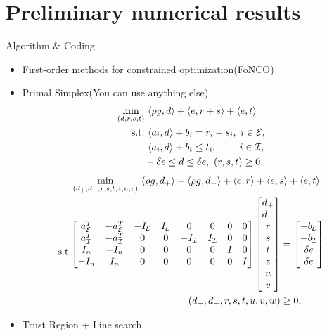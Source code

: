 \documentclass[8pt]{beamer}
\begin{document}
\section{Preliminary numerical results}
	
	\begin{frame}{Algorithm \& Coding}\begin{itemize}
		\vfill
			\item First-order methods for constrained optimization(FoNCO)
		\vfill
			\item Primal Simplex(You can use anything else)
		\vfill
			\begin{equation}\label{sub.primal.lp}
			  \baligned
				\min_{(d, r, s, t)} &\   \langle \rho g, d\rangle + \langle e, r+s\rangle + \langle e, t\rangle \ \\
				 \st &\  \langle a_i, d\rangle + b_i = r_i-s_i, \ i\in\Ecal, \\   
					  &\  \langle a_i, d\rangle + b_i \le t_i, \qquad\  i\in\Ical, \\   
					  & -\delta e \le  d \le \delta e, \   (r,s,t) \ge 0.
			  \ealigned
			\end{equation}
		\vfill
			\begin{equation}\label{primal.standard}
			  \begin{aligned}
				& \min_{(d_+, d_-, r, s, t, z, u, v)} \   \langle \rho g,  d_+\rangle  - \langle \rho g,  d_-\rangle + \langle e, r\rangle + \langle e, s\rangle + \langle e, t\rangle \ \\
				 {\rm{s.t.}} & \begin{aligned}
				 \begin{bmatrix}
				 a_{{\cal E}}^T & -a_{{\cal E}}^T  &  - I_{{\cal E}} & I_{{\cal E}} & 0 & 0  & 0 & 0 \\
				 a_{{\cal I}}^T  & -a_{{\cal I}}^T   &  0 & 0 & -I_{{\cal I}} & I_{{\cal I}} & 0 & 0 \\
				 I_n & - I_n & 0 & 0 & 0 & 0 & I  & 0  \\
				 -I_n& I_n & 0 & 0 & 0 & 0  &  0 & I 
				 \end{bmatrix}   
				 \begin{bmatrix} d_+ \\ d_- \\ r \\ s \\ t \\ z \\ u \\ v    \end{bmatrix} 
				 &= \begin{bmatrix} -b_{{\cal E}} \\ -b_{{\cal I}} \\  \delta e \\  \delta e  \end{bmatrix} \\  
					( d_+, d_-, r, s, t, u, v, w)  & \ge 0,
					  \end{aligned}
			  \end{aligned}
			\end{equation}
		\vfill 
			\item Trust Region + Line search
	\end{itemize}\end{frame}
\end{document}
